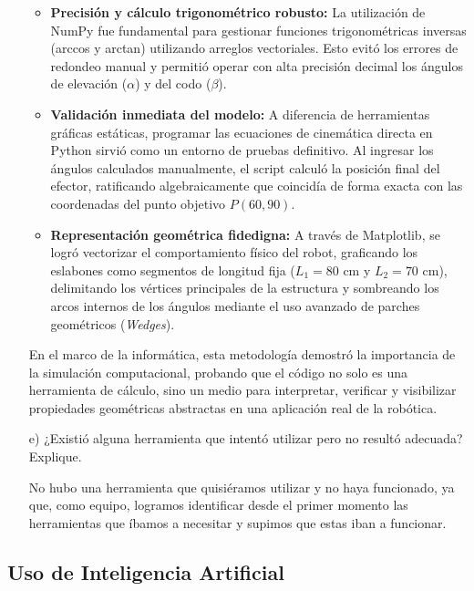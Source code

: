 \documentclass[12pt]{article}
\begin{document}
\begin{itemize}
\begin{itemize}
    \item \textbf{Precisión y cálculo trigonométrico robusto:} La utilización de NumPy fue fundamental para gestionar funciones trigonométricas inversas (arccos y arctan) utilizando arreglos vectoriales. Esto evitó los errores de redondeo manual y permitió operar con alta precisión decimal los ángulos de elevación ($\alpha$) y del codo ($\beta$).
    \item \textbf{Validación inmediata del modelo:} A diferencia de herramientas gráficas estáticas, programar las ecuaciones de cinemática directa en Python sirvió como un entorno de pruebas definitivo. Al ingresar los ángulos calculados manualmente, el script calculó la posición final del efector, ratificando algebraicamente que coincidía de forma exacta con las coordenadas del punto objetivo $P(60, 90)$.
    \item \textbf{Representación geométrica fidedigna:} A través de Matplotlib, se logró vectorizar el comportamiento físico del robot, graficando los eslabones como segmentos de longitud fija ($L_1 = 80 \text{ cm}$ y $L_2 = 70 \text{ cm}$), delimitando los vértices principales de la estructura y sombreando los arcos internos de los ángulos mediante el uso avanzado de parches geométricos (\textit{Wedges}).
\end{itemize}

En el marco de la informática, esta metodología demostró la importancia de la simulación computacional, probando que el código no solo es una herramienta de cálculo, sino un medio para interpretar, verificar y visibilizar propiedades geométricas abstractas en una aplicación real de la robótica.

\newpage
	\item[e)] ¿Existió alguna herramienta que intentó utilizar pero no resultó adecuada? Explique.
	
No hubo una herramienta que quisiéramos utilizar y no haya funcionado, ya que, como equipo, logramos identificar desde el primer momento las herramientas que íbamos a necesitar y supimos que estas iban a funcionar.
	
\end{itemize}

\subsection{Uso de Inteligencia Artificial}
\end{document}
